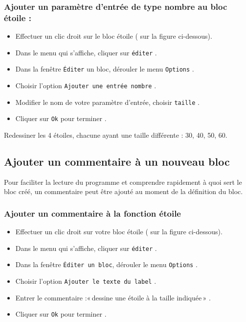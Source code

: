\subsubsection{Ajouter un paramètre d’entrée de type nombre au bloc étoile :}

\begin{itemize}
\item Effectuer un clic droit sur le bloc étoile ( sur la figure ci-dessous).
\item Dans le menu qui s’affiche, cliquer sur \texttt{éditer} .
\item Dans la fenêtre \texttt{Éditer} un bloc, dérouler le menu \texttt{Options} .
\item Choisir l’option \texttt{Ajouter une entrée nombre} .
\item Modifier le nom de votre paramètre d’entrée, choisir \texttt{taille} .
\item Cliquer sur \texttt{Ok} pour terminer .
\end{itemize}


\vspace{12pt}

Redessiner les 4 étoiles, chacune ayant une taille différente : 30, 40, 50, 60.

\vspace{12pt}

\subsection{Ajouter un commentaire à un nouveau bloc}

Pour faciliter la lecture du programme et comprendre rapidement à quoi sert le bloc créé, un commentaire peut être ajouté au moment de la définition du bloc.

\subsubsection{Ajouter un commentaire à la fonction étoile}

\begin{itemize}
\item Effectuer un clic droit sur votre bloc étoile ( sur la figure ci-dessous).
\item Dans le menu qui s’affiche, cliquer sur \texttt{éditer}  .
\item Dans la fenêtre \texttt{Éditer un bloc}, dérouler le menu \texttt{Options} .
\item Choisir l’option \texttt{Ajouter le texte du label}  .
\item Entrer le commentaire :«\,dessine une étoile à la taille indiquée\,» .
\item Cliquer sur \texttt{Ok} pour terminer .
\end{itemize}

